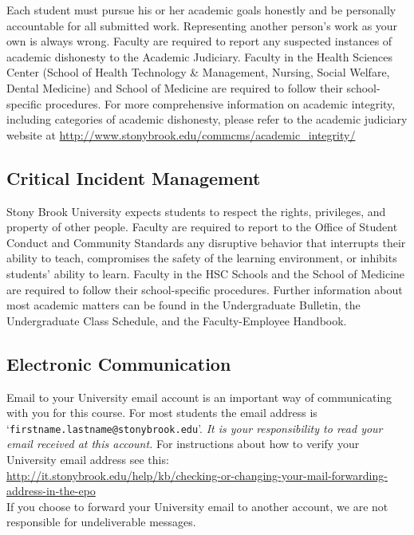 \documentclass[11pt]{article}
\begin{document}
Each student must pursue his or her academic goals honestly
and be personally accountable for all submitted work. Representing
another person's work as your own is always wrong. Faculty are
required to report any suspected instances of academic dishonesty to
the Academic Judiciary. Faculty in the Health Sciences Center (School
of Health Technology \& Management, Nursing, Social Welfare, Dental
Medicine) and School of Medicine are required to follow their
school-specific procedures. For more comprehensive information on
academic integrity, including categories of academic dishonesty,
please refer to the academic judiciary website at
\url{http://www.stonybrook.edu/commcms/academic\_integrity/}

\subsection*{Critical Incident Management}

Stony Brook University expects students to respect the rights,
privileges, and property of other people. Faculty are required to
report to the Office of Student Conduct and Community Standards any
disruptive behavior that interrupts their ability to teach,
compromises the safety of the learning environment, or inhibits
students' ability to learn. Faculty in the HSC Schools and the School
of Medicine are required to follow their school-specific
procedures. Further information about most academic matters can be
found in the Undergraduate Bulletin, the Undergraduate Class Schedule,
and the Faculty-Employee Handbook.


\subsection*{Electronic Communication}

Email to your University email account is an important way
of communicating with you for this course.  For most students the
email address is `{\tt firstname.lastname@stonybrook.edu}'.
{\em It is your responsibility to read your email received at this
  account.}  For instructions about how to verify your University
email address see this: \\
{\footnotesize \url{http://it.stonybrook.edu/help/kb/checking-or-changing-your-mail-forwarding-address-in-the-epo}}\\
If you choose to forward your University email to another account, we
are not responsible for undeliverable messages.
\end{document}
